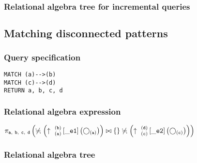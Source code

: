 \subsubsection*{Relational algebra tree for incremental queries}


\subsection{Matching disconnected patterns}

\subsubsection*{Query specification}

\begin{lstlisting}
MATCH (a)-->(b)
MATCH (c)-->(d)
RETURN a, b, c, d
\end{lstlisting}

\subsubsection*{Relational algebra expression}

$\projection{\var{a},~\var{b},~\var{c},~\var{d}} \left(\alldifferent{} \left(\expandout{a}{b}{}{\_e1}{} \left(\getvertices{a}{}\right)\right) \join \{\} \alldifferent{} \left(\expandout{c}{d}{}{\_e2}{} \left(\getvertices{c}{}\right)\right)\right)$

\subsubsection*{Relational algebra tree}


